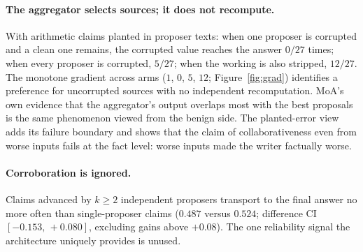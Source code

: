 \documentclass[11pt]{article}
\newcommand{\ci}[2]{\ensuremath{[#1,\,#2]}}
\begin{document}
\paragraph{The aggregator selects sources; it does not recompute.} With
arithmetic claims planted in proposer texts: when one proposer is
corrupted and a clean one remains, the corrupted value reaches the
answer $0/27$ times; when every proposer is corrupted, $5/27$; when the
working is also stripped, $12/27$. The monotone gradient across arms
($1$, $0$, $5$, $12$; Figure~\ref{fig:grad}) identifies a preference
for uncorrupted sources with no independent recomputation. MoA's own
evidence that the aggregator's output overlaps most with the best
proposals \cite{wang2024moa} is the same phenomenon viewed from the
benign side. The planted-error view adds its failure boundary and shows
that the claim of collaborativeness even from worse inputs fails at the
fact level: worse inputs made the writer factually worse.

\paragraph{Corroboration is ignored.} Claims advanced by $k\ge2$
independent proposers transport to the final answer no more often than
single-proposer claims ($0.487$ versus $0.524$; difference CI
\ci{-0.153}{+0.080}, excluding gains above $+0.08$). The one
reliability signal the architecture uniquely provides is unused.
\end{document}

